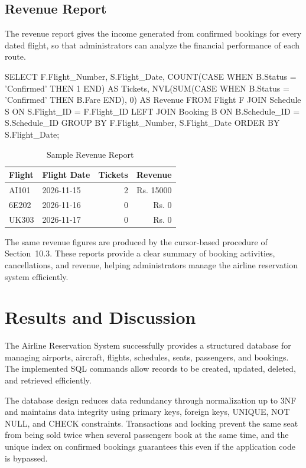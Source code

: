 \documentclass[12pt,a4paper]{article}
\begin{document}
\subsection{Revenue Report}
The revenue report gives the income generated from confirmed bookings for every dated flight, so that
administrators can analyze the financial performance of each route.
\begin{code}
SELECT F.Flight_Number, S.Flight_Date,
       COUNT(CASE WHEN B.Status = 'Confirmed' THEN 1 END) AS Tickets,
       NVL(SUM(CASE WHEN B.Status = 'Confirmed' THEN B.Fare END), 0) AS Revenue
FROM Flight F JOIN Schedule S ON S.Flight_ID = F.Flight_ID
LEFT JOIN Booking B ON B.Schedule_ID = S.Schedule_ID
GROUP BY F.Flight_Number, S.Flight_Date
ORDER BY S.Flight_Date;
\end{code}
\begin{table}[H]
\centering\small
\begin{tabular}{l l r r}
\toprule
\textbf{Flight} & \textbf{Flight Date} & \textbf{Tickets} & \textbf{Revenue}\\
\midrule
AI101 & 2026-11-15 & 2 & Rs. 15000\\
6E202 & 2026-11-16 & 0 & Rs. 0\\
UK303 & 2026-11-17 & 0 & Rs. 0\\
\bottomrule
\end{tabular}
\caption{Sample Revenue Report}
\end{table}
The same revenue figures are produced by the cursor-based procedure of Section~10.3. These reports provide a
clear summary of booking activities, cancellations, and revenue, helping administrators manage the airline
reservation system efficiently.

\section{Results and Discussion}
The Airline Reservation System successfully provides a structured database for managing airports, aircraft,
flights, schedules, seats, passengers, and bookings. The implemented SQL commands allow records to be
created, updated, deleted, and retrieved efficiently.

The database design reduces data redundancy through normalization up to 3NF and maintains data integrity
using primary keys, foreign keys, UNIQUE, NOT NULL, and CHECK constraints. Transactions and locking prevent
the same seat from being sold twice when several passengers book at the same time, and the unique index on
confirmed bookings guarantees this even if the application code is bypassed.
\end{document}
